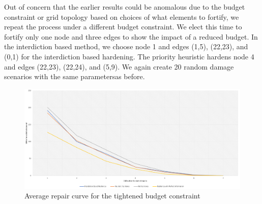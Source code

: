 Out of concern that the earlier results could be anomalous due to the budget constraint or grid topology based on choices of what elements to fortify, we repeat the process under a different budget constraint. We elect this time to fortify only one node and three edges to show the impact of a reduced budget. In the interdiction based method, we choose node 1 and edges (1,5), (22,23), and (0,1) for the interdiction based hardening. The priority heuristic hardens node 4 and edges (22,23), (22,24), and (5,9). We again create 20 random damage scenarios with the same parametersas before.
\begin{figure}[htbp]
	\centering
	\includegraphics[width=.9\linewidth]{LowBudgetSpaghetti.png}
	\caption{Average repair curve for the tightened budget constraint}
\end{figure}
\begin{table}[htbp]
	\centering
		\caption{Expected unsatisfied demand by shift across resilience methods for a reduced hardening budget}

	\label{time}
\end{table}

